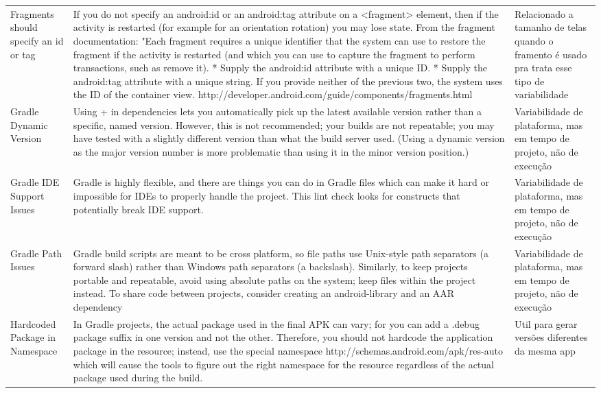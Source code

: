\begin{landscape}
\begin{longtable}{p{30mm}|p{180mm}|p{25mm}}
Fragments should specify an id or tag
&If you do not specify an android:id or an android:tag attribute on a <fragment> element, then if the activity is restarted (for example for an orientation rotation) you may lose state. From the fragment documentation: "Each fragment requires a unique identifier that the system can use to restore the fragment if the activity is restarted (and which you can use to capture the fragment to perform transactions, such as remove it). * Supply the android:id attribute with a unique ID. * Supply the android:tag attribute with a unique string. If you provide neither of the previous two, the system uses the ID of the container view. http://developer.android.com/guide/components/fragments.html
&Relacionado a tamanho de telas quando o framento é usado pra trata esse tipo de variabilidade\\

Gradle Dynamic Version
&Using + in dependencies lets you automatically pick up the latest available version rather than a specific, named version. However, this is not recommended; your builds are not repeatable; you may have tested with a slightly different version than what the build server used. (Using a dynamic version as the major version number is more problematic than using it in the minor version position.)
&Variabilidade de plataforma, mas em tempo de projeto, não de execução\\

Gradle IDE Support Issues
&Gradle is highly flexible, and there are things you can do in Gradle files which can make it hard or impossible for IDEs to properly handle the project. This lint check looks for constructs that potentially break IDE support.
&Variabilidade de plataforma, mas em tempo de projeto, não de execução\\

Gradle Path Issues
&Gradle build scripts are meant to be cross platform, so file paths use Unix-style path separators (a forward slash) rather than Windows path separators (a backslash). Similarly, to keep projects portable and repeatable, avoid using absolute paths on the system; keep files within the project instead. To share code between projects, consider creating an android-library and an AAR dependency
&Variabilidade de plataforma, mas em tempo de projeto, não de execução\\

Hardcoded Package in Namespace
&In Gradle projects, the actual package used in the final APK can vary; for you can add a .debug package suffix in one version and not the other. Therefore, you should not hardcode the application package in the resource; instead, use the special namespace http://schemas.android.com/apk/res-auto which will cause the tools to figure out the right namespace for the resource regardless of the actual package used during the build.
&Util para gerar versões diferentes da mesma app\\


\end{longtable}
\end{landscape}

